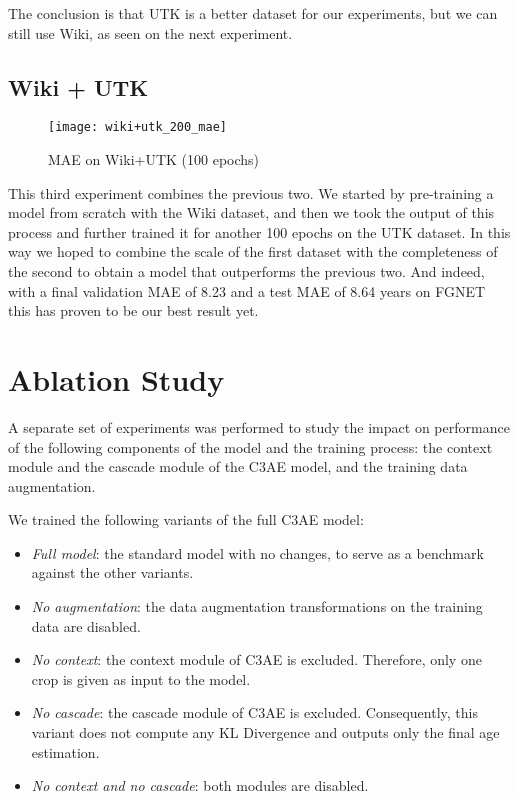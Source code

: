 The conclusion is that UTK is a better dataset for our experiments, but we can still 
use Wiki, as seen on the next experiment.

\subsection{Wiki + UTK}
\label{subsec:wikiutk}

\begin{wrapfigure}[11]{r}{0.5\textwidth}
  \centering
  \vspace{-20pt}
  \texttt{[image: wiki+utk\_200\_mae]}
  \caption{MAE on Wiki+UTK (100 epochs)}
  \label{fig:wiki+utk_loss}
\end{wrapfigure}

This third experiment combines the previous two. We started by pre-training a model from 
scratch with the Wiki dataset, and then we took the output of this process and further 
trained it for another 100 epochs on the UTK dataset. In this way we hoped to combine the
scale of the first dataset with the completeness of the second to obtain a model that
outperforms the previous two. And indeed, with a final validation MAE of 8.23 and a test
MAE of 8.64 years on FGNET this has proven to be our best result yet.

\section{Ablation Study}
\label{sec:ablation_study}
A separate set of experiments was performed to study the impact on performance
of the following components of the model and the training process:
the context module and the cascade module of the C3AE model,
and the training data augmentation.

We trained the following variants of the full C3AE model:

\begin{itemize}
  \item \textit{Full model}: the standard model with no changes,
    to serve as a benchmark against the other variants.
  \item \textit{No augmentation}: the data augmentation transformations
    on the training data are disabled.
  \item \textit{No context}: the context module of C3AE is excluded.
    Therefore, only one crop is given as input to the model.
  \item \textit{No cascade}: the cascade module of C3AE is excluded.
    Consequently, this variant does not compute any KL Divergence and 
    outputs only the final age estimation.
  \item \textit{No context and no cascade}: both modules are disabled.
\end{itemize}

